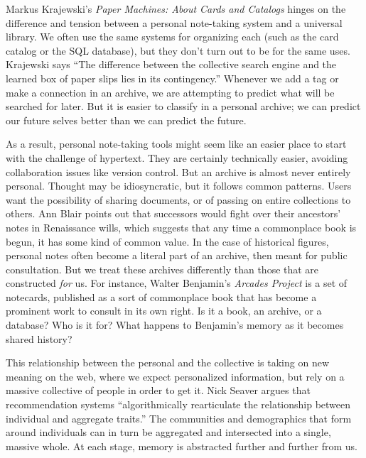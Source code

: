 Markus Krajewski's \emph{Paper Machines: About Cards and Catalogs} hinges on the difference and tension between a personal note-taking system and a universal library. We often use the same systems for organizing each (such as the card catalog or the SQL database), but they don't turn out to be for the same uses. Krajewski says ``The difference between the collective search engine and the learned box of paper slips lies in its contingency.''\autocite[50]{krajewski_paper_2011} Whenever we add a tag or make a connection in an archive, we are attempting to predict what will be searched for later. But it is easier to classify in a personal archive; we can predict our future selves better than we can predict the future.

As a result, personal note-taking tools might seem like an easier place to start with the challenge of hypertext. They are certainly technically easier, avoiding collaboration issues like version control. But an archive is almost never entirely personal. Thought may be idiosyncratic, but it follows common patterns. Users want the possibility of sharing documents, or of passing on entire collections to others. Ann Blair points out that successors would fight over their ancestors' notes in Renaissance wills, which suggests that any time a commonplace book is begun, it has some kind of common value.\autocite[104]{blair_note_2004} In the case of historical figures, personal notes often become a literal part of an archive, then meant for public consultation. But we treat these archives differently than those that are constructed \emph{for} us. For instance, Walter Benjamin's \emph{Arcades Project} is a set of notecards, published as a sort of commonplace book that has become a prominent work to consult in its own right. Is it a book, an archive, or a database? Who is it for? What happens to Benjamin's memory as it becomes shared history?

This relationship between the personal and the collective is taking on new meaning on the web, where we expect personalized information, but rely on a massive collective of people in order to get it. Nick Seaver argues that recommendation systems ``algorithmically rearticulate the relationship between individual and aggregate traits.''\autocite{seaver_algorithmic_2012} The communities and demographics that form around individuals can in turn be aggregated and intersected into a single, massive whole. At each stage, memory is abstracted further and further from us.

